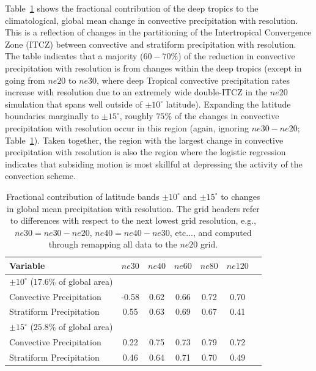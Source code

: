 \documentclass[times]{qjrms4}
\begin{document}
Table~\ref{tbl:table2} shows the fractional contribution of the deep tropics to the climatological, global mean change in convective precipitation with resolution. This is a reflection of changes in the partitioning of the Intertropical Convergence Zone (ITCZ) between convective and stratiform precipitation with resolution. The table indicates that a majority ($60-70 \%$) of the reduction in convective precipitation with resolution is from changes within the deep tropics (except in going from $ne20$ to $ne30$, where deep Tropical convective precipitation rates increase with resolution due to an extremely wide double-ITCZ in the $ne20$ simulation that spans well outside of $\pm 10^{\circ}$ latitude). Expanding the latitude boundaries marginally to $\pm 15^{\circ}$, roughly $75\%$ of the changes in convective precipitation with resolution occur in this region (again, ignoring $ne30-ne20$; Table~\ref{tbl:table2}). Taken together, the region with the largest change in convective precipitation with resolution is also the region where the logistic regression indicates that subsiding motion is most skillful at depressing the activity of the convection scheme.

 \begin{table}
 \caption{Fractional contribution of latitude bands $\pm 10^{\circ}$ and $\pm 15^{\circ}$ to changes in global mean precipitation with resolution. The grid headers refer to differences with respect to the next lowest grid resolution, e.g., $ne30 = ne30-ne20$, $ne40=ne40-ne30$, etc..., and computed through remapping all data to the $ne20$ grid.}
 \centering
 \scriptsize
 \begin{tabular}{lcccccc}
   \hline
   Variable & $ne30$ & $ne40$ & $ne60$ & $ne80$ & $ne120$ \\ 
   \hline
   $\pm 10^{\circ}$ ($17.6\%$ of global area) \\
   Convective Precipitation & -0.58 & 0.62 & 0.66 & 0.72 & 0.70 \\
   Stratiform Precipitation & 0.55 & 0.63 & 0.69 & 0.67 & 0.41 \\ 
   \hline
   $\pm 15^{\circ}$ ($25.8\%$ of global area) \\
   Convective Precipitation & 0.22 & 0.75 & 0.73 & 0.79 & 0.72 \\
   Stratiform Precipitation & 0.46 & 0.64 & 0.71 & 0.70 & 0.49 \\      
 \hline
 \end{tabular}
 \label{tbl:table2}
 \end{table}
\end{document}
